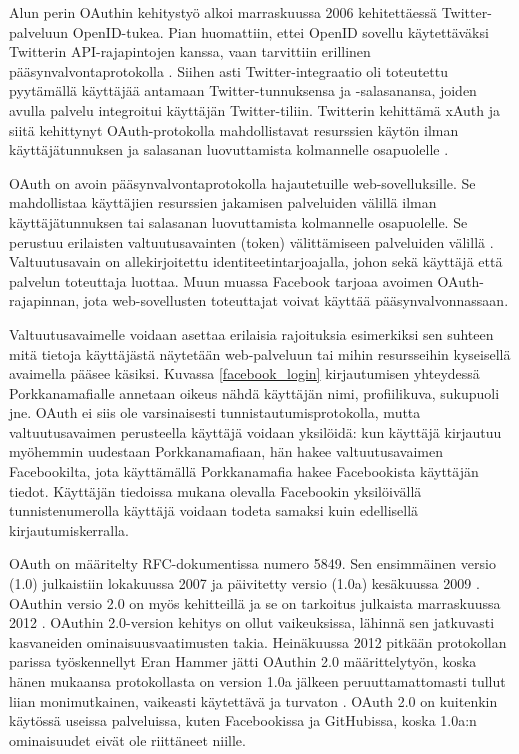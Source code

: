 Alun perin OAuthin kehitystyö alkoi marraskuussa 2006 kehitettäessä Twitter-pal\-ve\-luun OpenID-tukea. Pian huomattiin, ettei OpenID sovellu käytettäväksi Twitterin API-rajapintojen kanssa, vaan tarvittiin erillinen pääsynvalvontaprotokolla \cite{oauth_primer}. Siihen asti Twitter-integraatio oli toteutettu pyytämällä käyttäjää antamaan Twitter-tunnuksensa ja -salasanansa, joiden avulla palvelu integroitui käyttäjän Twitter-tiliin. Twitterin kehittämä xAuth ja siitä kehittynyt OAuth-protokolla mahdollistavat resurssien käytön ilman käyttäjätunnuksen ja salasanan luovuttamista kolmannelle osapuolelle \cite{oauth2_0}.

OAuth on avoin pääsynvalvontaprotokolla hajautetuille web-sovelluksille. Se mahdollistaa käyttäjien resurssien jakamisen palveluiden välillä ilman käyttäjätunnuksen tai salasanan luovuttamista kolmannelle osapuolelle. Se perustuu erilaisten valtuutusavainten (token) välittämiseen palveluiden välillä \cite{oauth2_0}. Valtuutusavain on allekirjoitettu identiteetintarjoajalla, johon sekä käyttäjä että palvelun toteuttaja luottaa. Muun muassa Facebook tarjoaa avoimen OAuth-rajapinnan, jota web-sovellusten toteuttajat voivat käyttää pääsynvalvonnassaan.

Valtuutusavaimelle voidaan asettaa erilaisia rajoituksia esimerkiksi sen suhteen mitä tietoja käyttäjästä näytetään web-palveluun tai mihin resursseihin kyseisellä avaimella pääsee käsiksi. Kuvassa \ref{facebook_login} kirjautumisen yhteydessä Porkkanamafialle annetaan oikeus nähdä käyttäjän nimi, profiilikuva, sukupuoli jne. OAuth ei siis ole varsinaisesti tunnistautumisprotokolla, mutta valtuutusavaimen perusteella käyttäjä voidaan yksilöidä: kun käyttäjä kirjautuu myöhemmin uudestaan Porkkanamafiaan, hän hakee valtuutusavaimen Facebookilta, jota käyttämällä Porkkanamafia hakee Facebookista käyttäjän tiedot. Käyttäjän tiedoissa mukana olevalla Facebookin yksilöivällä tunnistenumerolla käyttäjä voidaan todeta samaksi kuin edellisellä kirjautumiskerralla.

OAuth on määritelty RFC-dokumentissa numero 5849. Sen ensimmäinen versio (1.0) julkaistiin lokakuussa 2007 ja päivitetty versio (1.0a) kesäkuussa 2009 \cite{oauth2_0}. OAuthin versio 2.0 on myös kehitteillä ja se on tarkoitus julkaista marraskuussa 2012 \cite{oauth2_0}. OAuthin 2.0-version kehitys on ollut vaikeuksissa, lähinnä sen jatkuvasti kasvaneiden ominaisuusvaatimusten takia. Heinäkuussa 2012 pitkään protokollan parissa työskennellyt Eran Hammer jätti OAuthin 2.0 määrittelytyön, koska hänen mukaansa protokollasta on version 1.0a jälkeen peruuttamattomasti tullut liian monimutkainen, vaikeasti käytettävä ja turvaton \cite{oauth_ragequit}. OAuth 2.0 on kuitenkin käytössä useissa palveluissa, kuten Facebookissa ja GitHubissa, koska 1.0a:n ominaisuudet eivät ole riittäneet niille.